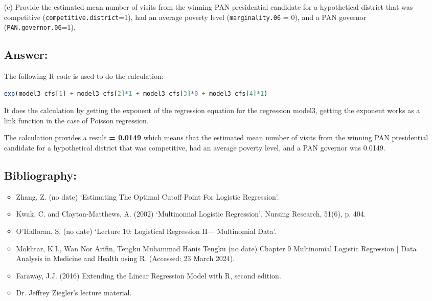 \documentclass[12pt,letterpaper]{article}
\begin{document}
\begin{enumerate}
	
	\item [(c)]
	Provide the estimated mean number of visits from the winning PAN presidential candidate for a hypothetical district that was competitive (\texttt{competitive.district}=1), had an average poverty level (\texttt{marginality.06} = 0), and a PAN governor (\texttt{PAN.governor.06}=1).
	
\subsection*{Answer:}

The following R code is used to do the calculation:
\begin{lstlisting}[language=R]
	exp(model3_cfs[1] + model3_cfs[2]*1 + model3_cfs[3]*0 + model3_cfs[4]*1)
\end{lstlisting}

It does the calculation by getting the exponent of the regression equation for the regression model3, getting the exponent works as a link function in the case of Poisson regression.

The calculation provides a result \textbf{= 0.0149} which means that the estimated mean number of visits from the winning PAN presidential candidate for a hypothetical district that was competitive, had an average poverty level, and a PAN governor was 0.0149. 

\subsection*{Bibliography:}

\begin{itemize}
	\item Zhang, Z. (no date) ‘Estimating The Optimal Cutoff Point For Logistic Regression’.
	\item Kwak, C. and Clayton-Matthews, A. (2002) ‘Multinomial Logistic Regression’, Nursing Research, 51(6), p. 404.
	\item O’Halloran, S. (no date) ‘Lecture 10: Logistical Regression II— Multinomial Data’.
	\item Mokhtar, K.I., Wan Nor Arifin, Tengku Muhammad Hanis Tengku (no date) Chapter 9 Multinomial Logistic Regression | Data Analysis in Medicine and Health using R. (Accessed: 23 March 2024).
	\item Faraway, J.J. (2016) Extending the Linear Regression Model with R, second edition.
	\item Dr. Jeffrey Ziegler's lecture material.
\end{itemize}

	
\end{enumerate}
\end{document}

